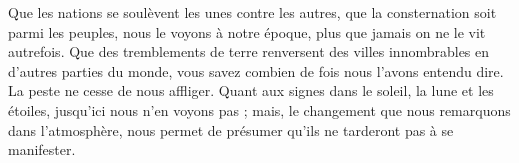 Que les nations se soulèvent les unes contre les autres, que la consternation soit parmi les peuples, nous le voyons à notre époque, plus que jamais on ne le vit autrefois. Que des tremblements de terre renversent des villes innombrables en d’autres parties du monde, vous savez combien de fois nous l’avons entendu dire. La peste ne cesse de nous affliger. Quant aux signes dans le soleil, la lune et les étoiles, jusqu’ici nous n’en voyons pas ; mais, le changement que nous remarquons dans l’atmosphère, nous permet de présumer qu’ils ne tarderont pas à se manifester.